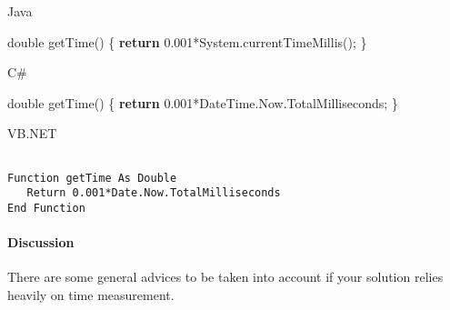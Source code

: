 \documentclass[]{article}
\newenvironment{Shaded}{}{}
\newcommand{\BuiltInTok}[1]{#1}
\newcommand{\DataTypeTok}[1]{\textcolor[rgb]{0.56,0.13,0.00}{#1}}
\newcommand{\FloatTok}[1]{\textcolor[rgb]{0.25,0.63,0.44}{#1}}
\newcommand{\FunctionTok}[1]{\textcolor[rgb]{0.02,0.16,0.49}{#1}}
\newcommand{\KeywordTok}[1]{\textcolor[rgb]{0.00,0.44,0.13}{\textbf{#1}}}
\newcommand{\NormalTok}[1]{#1}
\let\oldparagraph\paragraph
\renewcommand{\paragraph}[1]{\oldparagraph{#1}\mbox{}}
\begin{document}
Java

\begin{Shaded}
\begin{Highlighting}[]

\DataTypeTok{double} \FunctionTok{getTime}\NormalTok{() \{}
   \KeywordTok{return} \FloatTok{0.001}\NormalTok{*}\BuiltInTok{System}\NormalTok{.}\FunctionTok{currentTimeMillis}\NormalTok{();}
\NormalTok{\}}
\end{Highlighting}
\end{Shaded}

C\#

\begin{Shaded}
\begin{Highlighting}[]

\DataTypeTok{double} \FunctionTok{getTime}\NormalTok{() \{}
   \KeywordTok{return} \FloatTok{0.001}\NormalTok{*DateTime.}\FunctionTok{Now}\NormalTok{.}\FunctionTok{TotalMilliseconds}\NormalTok{;}
\NormalTok{\}}
\end{Highlighting}
\end{Shaded}

VB.NET

\begin{verbatim}

Function getTime As Double
   Return 0.001*Date.Now.TotalMilliseconds
End Function
\end{verbatim}

\begin{Shaded}
\begin{Highlighting}[]

\end{Highlighting}
\end{Shaded}

\hypertarget{discussion}{%
\paragraph{Discussion}\label{discussion}}

There are some general advices to be taken into account if your solution
relies heavily on time measurement.
\end{document}
